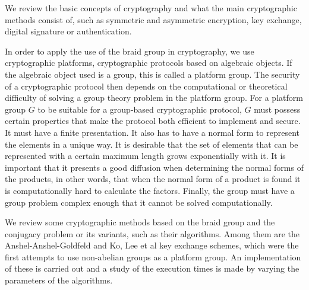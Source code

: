 \documentclass[12pt]{book}
\theoremstyle{definition}
\begin{document}
We review the basic concepts of cryptography and what the main cryptographic methods consist of, such as symmetric and asymmetric encryption, key exchange, digital signature or authentication.

In order to apply the use of the braid group in cryptography, we use cryptographic platforms, cryptographic protocols based on algebraic objects. If the algebraic object used is a group, this is called a platform group. The security of a cryptographic protocol then depends on the computational or theoretical difficulty of solving a group theory problem in the platform group. For a platform group $G$ to be suitable for a group-based cryptographic protocol, $G$ must possess certain properties that make the protocol both efficient to implement and secure. It must have a finite presentation. It also has to have a normal form to represent the elements in a unique way. It is desirable that the set of elements that can be represented with a certain maximum length grows exponentially with it. It is important that it presents a good diffusion when determining the normal forms of the products, in other words, that when the normal form of a product is found it is computationally hard to calculate the factors. Finally, the group must have a group problem complex enough that it cannot be solved computationally.

We review some cryptographic methods based on the braid group and the conjugacy problem or its variants, such as their algorithms. Among them are the Anshel-Anshel-Goldfeld and Ko, Lee et al key exchange schemes, which were the first attempts to use non-abelian groups as a platform group. An implementation of these is carried out and a study of the execution times is made by varying the parameters of the algorithms.
\end{document}
